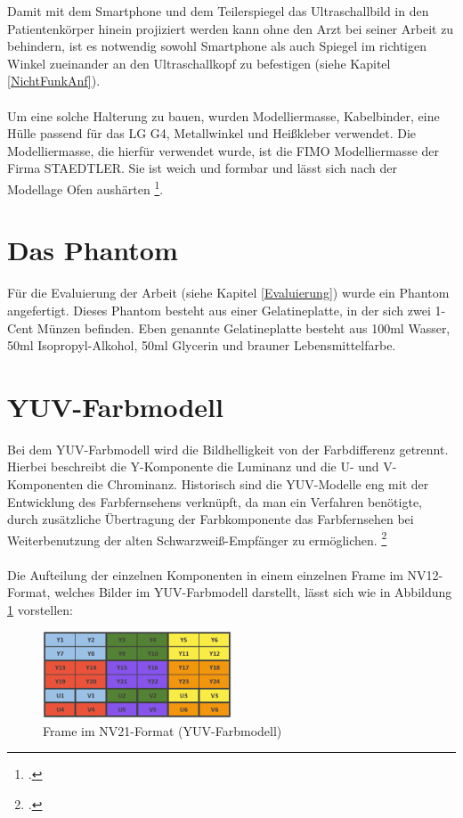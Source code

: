 Damit mit dem Smartphone und dem Teilerspiegel das Ultraschallbild in den Patientenkörper hinein projiziert werden kann ohne den Arzt bei seiner Arbeit zu behindern, ist es notwendig sowohl Smartphone als auch Spiegel im richtigen Winkel zueinander an den Ultraschallkopf zu befestigen (siehe Kapitel \ref{NichtFunkAnf}).
\\
\\
Um eine solche Halterung zu bauen, wurden Modelliermasse, Kabelbinder, eine Hülle passend für das LG G4, Metallwinkel und Heißkleber verwendet. Die Modelliermasse, die hierfür verwendet wurde, ist die FIMO Modelliermasse der Firma STAEDTLER. Sie ist weich und formbar und lässt sich nach der Modellage Ofen aushärten \footcite{FIMO}.

\section{Das Phantom} \label{Phantom}

Für die Evaluierung der Arbeit (siehe Kapitel \ref{Evaluierung}) wurde ein Phantom angefertigt. Dieses Phantom besteht aus einer Gelatineplatte, in der sich zwei 1-Cent Münzen befinden. Eben genannte Gelatineplatte besteht aus 100ml Wasser, 50ml Isopropyl-Alkohol, 50ml Glycerin und brauner Lebensmittelfarbe.

\section{YUV-Farbmodell} \label{YUV}

Bei dem YUV-Farbmodell wird die Bildhelligkeit von der Farbdifferenz getrennt. Hierbei beschreibt die Y-Komponente die Luminanz und die U- und V-Komponenten die Chrominanz. Historisch sind die YUV-Modelle eng mit der Entwicklung des Farbfernsehens verknüpft, da man ein Verfahren benötigte, durch zusätzliche Übertragung der Farbkomponente das Farbfernsehen bei Weiterbenutzung der alten Schwarzweiß-Empfänger zu ermöglichen. \footcite{YUV_Farbmodell}
\\
\\
Die Aufteilung der einzelnen Komponenten in einem einzelnen Frame im NV12-Format, welches Bilder im YUV-Farbmodell darstellt, lässt sich wie in Abbildung \ref{fig:YUV_Frame} vorstellen:


\begin{figure}[h]
	\centering
	\includegraphics[width=0.5\textwidth]{Bilder/Materialien_und_Grundlagen/YUV_Frame.PNG}
	\caption{Frame im NV21-Format (YUV-Farbmodell)}
	\label{fig:YUV_Frame}
\end{figure}

